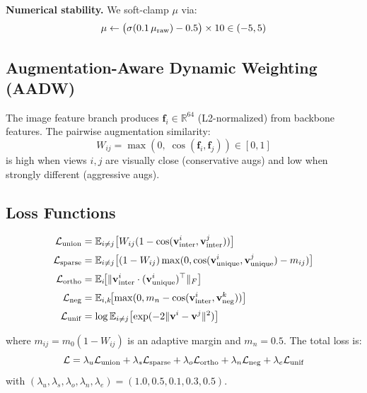 \documentclass[10pt,twocolumn]{article}
\begin{document}
\textbf{Numerical stability.} We soft-clamp $\mu$ via:
\begin{equation}
\mu \leftarrow \bigl(\sigma(0.1\,\mu_{\rm raw}) - 0.5\bigr)\times 10 \in (-5, 5)
\end{equation}

\subsection{Augmentation-Aware Dynamic Weighting (AADW)}

The image feature branch produces $\mathbf{f}_i\in\mathbb{R}^{64}$ (L2-normalized)
from backbone features. The pairwise augmentation similarity:
\begin{equation}
W_{ij} = \max(0,\; \cos(\mathbf{f}_i, \mathbf{f}_j)) \in [0, 1]
\label{eq:weight}
\end{equation}
is high when views $i,j$ are visually close (conservative augs) and low when
strongly different (aggressive augs).

\subsection{Loss Functions}

\begin{align}
\mathcal{L}_{\rm union}  &= \mathbb{E}_{i\neq j}\bigl[W_{ij}(1-\cos(\mathbf{v}^i_{\rm inter}, \mathbf{v}^j_{\rm inter}))\bigr]
\label{eq:Lunion}\\[2pt]
\mathcal{L}_{\rm sparse} &= \mathbb{E}_{i\neq j}\bigl[(1-W_{ij})\max(0, \cos(\mathbf{v}^i_{\rm unique}, \mathbf{v}^j_{\rm unique})-m_{ij})\bigr]
\label{eq:Lsparse}\\[2pt]
\mathcal{L}_{\rm ortho}  &= \mathbb{E}_i\!\bigl[\|\mathbf{v}^i_{\rm inter}\cdot(\mathbf{v}^i_{\rm unique})^\top\|_F\bigr]
\label{eq:Lortho}\\[2pt]
\mathcal{L}_{\rm neg}    &= \mathbb{E}_{i,k}\!\bigl[\max(0, m_n - \cos(\mathbf{v}^i_{\rm inter}, \mathbf{v}^k_{\rm neg}))\bigr]
\label{eq:Lneg}\\[2pt]
\mathcal{L}_{\rm unif}   &= \log\mathbb{E}_{i\neq j}\bigl[\exp(-2\|\mathbf{v}^i - \mathbf{v}^j\|^2)\bigr]
\label{eq:Lunif}
\end{align}

where $m_{ij}{=}m_0(1-W_{ij})$ is an adaptive margin and $m_n{=}0.5$.
The total loss is:
\begin{equation}
\mathcal{L} = \lambda_u\mathcal{L}_{\rm union} + \lambda_s\mathcal{L}_{\rm sparse}
+ \lambda_o\mathcal{L}_{\rm ortho} + \lambda_n\mathcal{L}_{\rm neg}
+ \lambda_e\mathcal{L}_{\rm unif}
\end{equation}
with $(\lambda_u,\lambda_s,\lambda_o,\lambda_n,\lambda_e) = (1.0, 0.5, 0.1, 0.3, 0.5)$.
\end{document}
